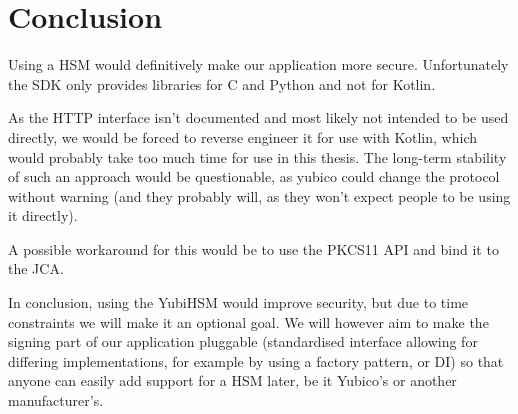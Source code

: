 \section{Conclusion}\label{sec:conclusion}
Using a \gls{HSM} would definitively make our application more secure.
Unfortunately the \gls{SDK} only provides libraries for C and Python and not for Kotlin.

As the \gls{HTTP} interface isn't documented and most likely not intended to be used directly,
we would be forced to reverse engineer it for use with Kotlin,
which would probably take too much time for use in this thesis.
The long-term stability of such an approach would be questionable,
as yubico could change the protocol without warning (and they probably will, as they won't expect people to be using it directly).

A possible workaround for this would be to use the \gls{PKCS11} \gls{API} and bind it to the \gls{JCA}.

In conclusion, using the YubiHSM would improve security, but due to time constraints we will make it an optional goal.
We will however aim to make the signing part of our application pluggable (standardised interface allowing for differing implementations,
for example by using a factory pattern, or \gls{DI}) so that anyone can easily add support for a \gls{HSM} later,
be it Yubico's or another manufacturer's.
